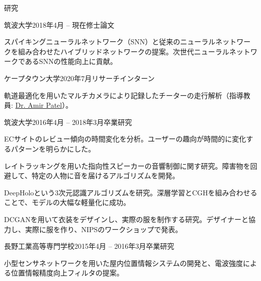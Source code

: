 \documentclass{resume} %
\begin{document}
\begin{rSection}{研究}

    \begin{rSubsection}{筑波大学}{2018年4月 -- 現在}{修士論文}{}
    \item スパイキングニューラルネットワーク（SNN）と従来のニューラルネットワークを組み合わせたハイブリッドネットワークの提案。次世代ニューラルネットワークであるSNNの性能向上に貢献。
    \end{rSubsection}

    \begin{rSubsection}{ケープタウン大学}{2020年7月}{リサーチインターン}{}
    \item 軌道最適化を用いたマルチカメラにより記録したチーターの走行解析（指導教員: \href{https://scholar.google.co.za/citations?user=RxMigV4AAAAJ&view_op=list_works&sortby=pubdate}{Dr. Amir Patel}）。
    \end{rSubsection}

    \begin{rSubsection}{筑波大学}{2016年4月 -- 2018年3月}{卒業研究}{}
    \item ECサイトのレビュー傾向の時間変化を分析。ユーザーの趣向が時間的に変化するパターンを明らかにした。
    \item レイトラッキングを用いた指向性スピーカーの音響制御に関す研究。障害物を回避して、特定の人物に音を届けるアルゴリズムを開発。
    \item DeepHoloという3次元認識アルゴリズムを研究。深層学習とCGHを組み合わせることで、モデルの大幅な軽量化に成功。
    \item DCGANを用いて衣装をデザインし、実際の服を制作する研究。デザイナーと協力し、実際に服を作り、NIPSのワークショップで発表。
    \end{rSubsection}

    \begin{rSubsection}{長野工業高等専門学校}{2015年4月 -- 2016年3月}{卒業研究}{}
    \item 小型センサネットワークを用いた屋内位置情報システムの開発と、電波強度による位置情報精度向上フィルタの提案。
    \end{rSubsection}

\end{rSection}

\end{document}
